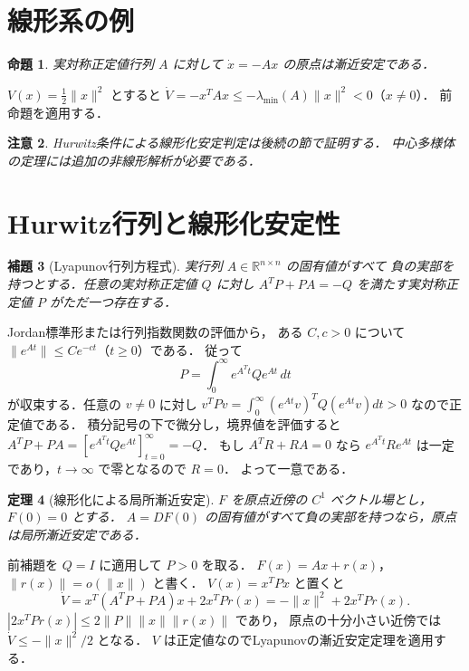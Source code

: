 \documentclass[a5paper,10pt,onecolumn]{jsarticle}
\makeatletter
\theoremstyle{mathnotetheorem}
\newtheorem{theorem}{定理}[section]
\newtheorem{lemma}[theorem]{補題}
\newtheorem{proposition}[theorem]{命題}
\newtheorem{remark}[theorem]{注意}
\renewcommand{\proofname}{証明}
\renewenvironment{proof}[1][\proofname]{%
  \par\pushQED{\qed}\normalfont\topsep4\p@\@plus2\p@\relax
  \trivlist\item[\hskip\labelsep\bfseries #1]\ignorespaces
}{\popQED\endtrivlist\@endpefalse}
\newcommand{\norm}[1]{\lVert #1\rVert}
\makeatother
\begin{document}
\section{線形系の例}
\begin{proposition}
実対称正定値行列 $A$ に対して $\dot x=-Ax$ の原点は漸近安定である．
\end{proposition}
\begin{proof}
$V(x)=\frac12\norm x^2$ とすると
$\dot V=-x^TAx\le-\lambda_{\min}(A)\norm x^2<0$（$x\ne0$）．
前命題を適用する．
\end{proof}
\begin{remark}
Hurwitz条件による線形化安定判定は後続の節で証明する．
中心多様体の定理には追加の非線形解析が必要である．
\end{remark}


\section{Hurwitz行列と線形化安定性}
\begin{lemma}[Lyapunov行列方程式]
実行列 $A\in\mathbb R^{n\times n}$ の固有値がすべて
負の実部を持つとする．任意の実対称正定値 $Q$ に対し
$A^TP+PA=-Q$ を満たす実対称正定値 $P$ がただ一つ存在する．
\end{lemma}
\begin{proof}
Jordan標準形または行列指数関数の評価から，
ある $C,c>0$ について $\norm{e^{At}}\le Ce^{-ct}$（$t\ge0$）である．
従って
\[
 P=\int_0^\infty e^{A^Tt}Qe^{At}\,dt
\]
が収束する．任意の $v\ne0$ に対し
$v^TPv=\int_0^\infty(e^{At}v)^TQ(e^{At}v)dt>0$ なので正定値である．
積分記号の下で微分し，境界値を評価すると
$A^TP+PA=[e^{A^Tt}Qe^{At}]_{t=0}^{\infty}=-Q$．
もし $A^TR+RA=0$ なら
$e^{A^Tt}Re^{At}$ は一定であり，$t\to\infty$ で零となるので $R=0$．
よって一意である．
\end{proof}
\begin{theorem}[線形化による局所漸近安定]
$F$ を原点近傍の $C^1$ ベクトル場とし，$F(0)=0$ とする．
$A=DF(0)$ の固有値がすべて負の実部を持つなら，原点は局所漸近安定である．
\end{theorem}
\begin{proof}
前補題を $Q=I$ に適用して $P>0$ を取る．
$F(x)=Ax+r(x)$，$\norm{r(x)}=o(\norm x)$ と書く．
$V(x)=x^TPx$ と置くと
\[
 \dot V=x^T(A^TP+PA)x+2x^TPr(x)
 =-\norm x^2+2x^TPr(x).
\]
$|2x^TPr(x)|\le2\norm P\norm x\norm{r(x)}$ であり，
原点の十分小さい近傍では $\dot V\le-\norm x^2/2$ となる．
$V$ は正定値なのでLyapunovの漸近安定定理を適用する．
\end{proof}
\end{document}
